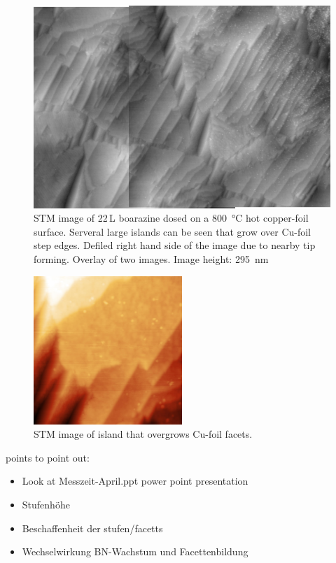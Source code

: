 \begin{figure}
 \centering
 \includegraphics[width=\textwidth]{./images/150423-1008-1027}
 \caption{STM image of 22\,L boarazine dosed on a \SI{800}{\degreeCelsius} hot copper-foil surface. Serveral large islands can be seen that grow over Cu-foil step edges. Defiled right hand side of the image due to nearby tip forming. Overlay of two images. Image height: \SI{295}{\nm}}
\end{figure}

\begin{figure}
 \centering
 \includegraphics[width=0.5\textwidth]{./images/F150423-114214.jpg}
 \caption{STM image of island that overgrows Cu-foil facets.}
 \label{fig:23.04}
\end{figure}

points to point out:
\begin{itemize}
 \item Look at Messzeit-April.ppt power point presentation
 \item Stufenh\"ohe
 \item Beschaffenheit der stufen/facetts
 \item Wechselwirkung BN-Wachstum und Facettenbildung
\end{itemize}